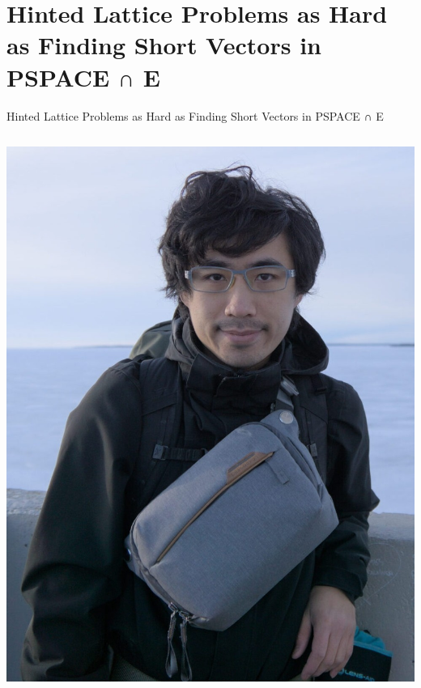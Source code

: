 \documentclass[xcolor=table,10pt,aspectratio=169]{beamer}
\begin{document}
\section{Hinted Lattice Problems as Hard as Finding Short Vectors in PSPACE ∩ E}
\label{sec:orgfa699be}
\begin{frame}[label={sec:orgd509772}]{Hinted Lattice Problems as Hard as Finding Short Vectors in PSPACE ∩ E}
\begin{columns}
\begin{column}{0.5\columnwidth}
\begin{center}
\includegraphics[keepaspectratio,frame,height=0.6\textheight]{./russell.jpg}
\end{center}
\end{column}



\end{columns}
\end{frame}
\end{document}
